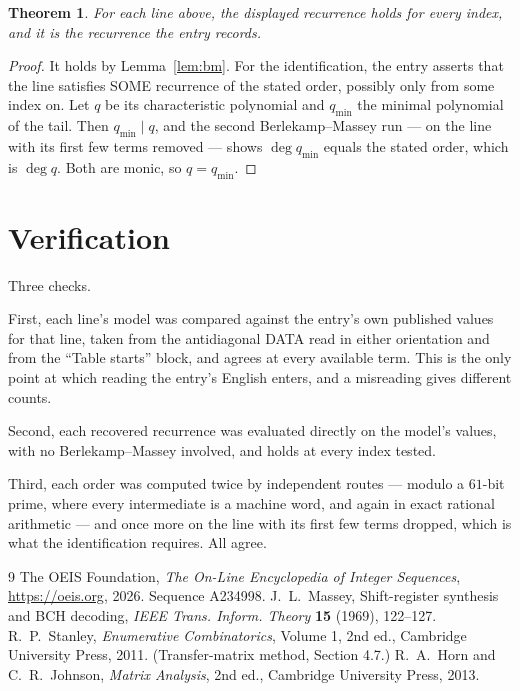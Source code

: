 \documentclass[11pt,a4paper]{article}
\theoremstyle{plain}
\newtheorem{theorem}{Theorem}
\theoremstyle{definition}
\begin{document}
\begin{theorem}
For each line above, the displayed recurrence holds for every index, and it is the recurrence
the entry records.
\end{theorem}

\begin{proof}
It holds by Lemma~\ref{lem:bm}. For the identification, the entry asserts that the line
satisfies SOME recurrence of the stated order, possibly only from some index on. Let $q$ be its
characteristic polynomial and $q_{\min}$ the minimal polynomial of the tail. Then
$q_{\min}\mid q$, and the second Berlekamp--Massey run --- on the line with its first few
terms removed --- shows $\deg q_{\min}$ equals the stated order, which is $\deg q$. Both are
monic, so $q=q_{\min}$.
\end{proof}

\section{Verification}

Three checks.

First, each line's model was compared against the entry's own published values for that line,
taken from the antidiagonal DATA read in either orientation and from the ``Table starts''
block, and agrees at every available term. This is the only point at which reading the entry's
English enters, and a misreading gives different counts.

Second, each recovered recurrence was evaluated directly on the model's values, with no
Berlekamp--Massey involved, and holds at every index tested.

Third, each order was computed twice by independent routes --- modulo a $61$-bit prime, where
every intermediate is a machine word, and again in exact rational arithmetic --- and once more
on the line with its first few terms dropped, which is what the identification requires. All
agree.

\begin{thebibliography}{9}
 The OEIS Foundation, \emph{The On-Line Encyclopedia of Integer
Sequences}, \url{https://oeis.org}, 2026. Sequence A234998.
 J.~L.~Massey, Shift-register synthesis and BCH decoding, \emph{IEEE
Trans. Inform. Theory} \textbf{15} (1969), 122--127.
 R.~P.~Stanley, \emph{Enumerative Combinatorics}, Volume 1, 2nd ed.,
Cambridge University Press, 2011. (Transfer-matrix method, Section 4.7.)
 R.~A.~Horn and C.~R.~Johnson, \emph{Matrix Analysis}, 2nd ed., Cambridge
University Press, 2013.
\end{thebibliography}
\end{document}
